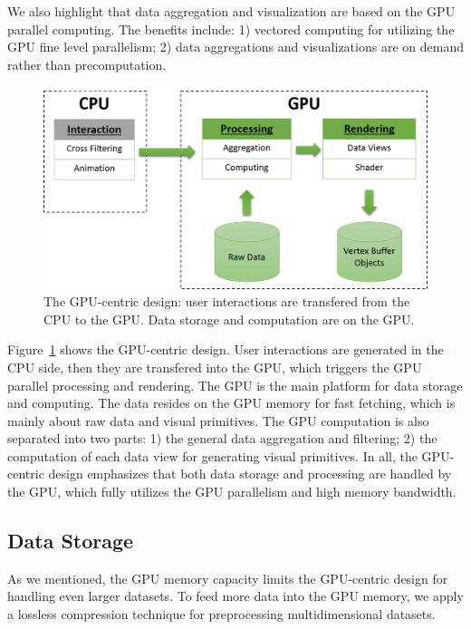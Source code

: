 We also highlight that data aggregation and visualization are  based on the GPU parallel computing. The benefits include: 1) vectored computing for utilizing the GPU fine level parallelism; 2) data aggregations  and visualizations are on demand rather than precomputation.


\begin{figure}[htb]
	\centering
	
	\includegraphics[width=1.0\linewidth]{pic/arch.png}
	\parbox[t]{1.0\columnwidth}{\relax
	}
	\caption{\label{fig:architecture} The GPU-centric design: user interactions are transfered from the CPU to the GPU. Data storage and computation are on the GPU. }
\end{figure}


Figure~\ref{fig:architecture} shows the GPU-centric design. User interactions are generated in the CPU side, then they are transfered into the GPU, which triggers the GPU parallel processing and rendering.
The GPU is the main platform for data storage and  computing. 
The data resides on the GPU memory for fast fetching, which is mainly about raw data and visual primitives.  The GPU computation is also separated into two parts: 1) the general data aggregation and filtering; 2) the computation of each data view for generating visual primitives.  
In all, the GPU-centric design emphasizes that both data storage and processing are handled by the GPU, which fully utilizes the GPU  parallelism and high memory bandwidth.

\subsection{Data Storage}
As we mentioned, the GPU memory capacity limits the GPU-centric design for handling even larger datasets.  To feed more data into the GPU memory, we apply a lossless compression technique for preprocessing  multidimensional datasets. 

